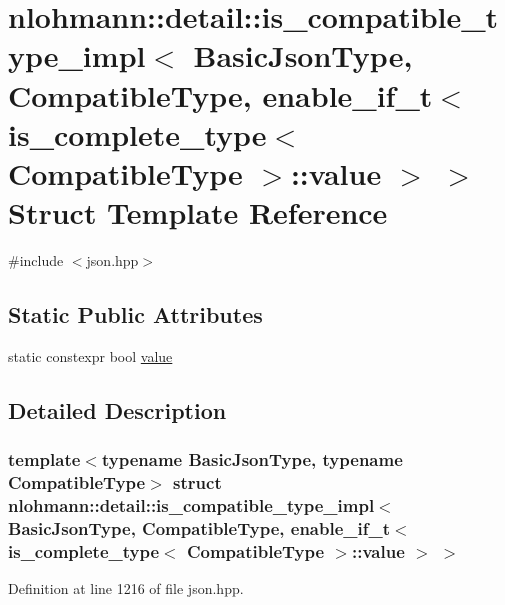 \hypertarget{structnlohmann_1_1detail_1_1is__compatible__type__impl_3_01_basic_json_type_00_01_compatible_typ632bee7ec037fc0233f1bbe9dd7d8874}{}\section{nlohmann\+::detail\+::is\+\_\+compatible\+\_\+type\+\_\+impl$<$ Basic\+Json\+Type, Compatible\+Type, enable\+\_\+if\+\_\+t$<$ is\+\_\+complete\+\_\+type$<$ Compatible\+Type $>$\+::value $>$ $>$ Struct Template Reference}
\label{structnlohmann_1_1detail_1_1is__compatible__type__impl_3_01_basic_json_type_00_01_compatible_typ632bee7ec037fc0233f1bbe9dd7d8874}


{\ttfamily \#include $<$json.\+hpp$>$}

\subsection*{Static Public Attributes}
\begin{DoxyCompactItemize}
\item 
static constexpr bool \mbox{\hyperlink{structnlohmann_1_1detail_1_1is__compatible__type__impl_3_01_basic_json_type_00_01_compatible_typ632bee7ec037fc0233f1bbe9dd7d8874_a1e4cacef2d41bdc682a1e2946edb0a41}{value}}
\end{DoxyCompactItemize}


\subsection{Detailed Description}
\subsubsection*{template$<$typename Basic\+Json\+Type, typename Compatible\+Type$>$\newline
struct nlohmann\+::detail\+::is\+\_\+compatible\+\_\+type\+\_\+impl$<$ Basic\+Json\+Type, Compatible\+Type, enable\+\_\+if\+\_\+t$<$ is\+\_\+complete\+\_\+type$<$ Compatible\+Type $>$\+::value $>$ $>$}



Definition at line 1216 of file json.\+hpp.



